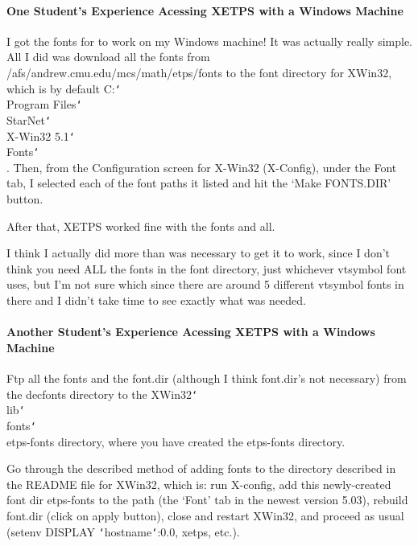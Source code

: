 \documentclass{article}
\begin{document}
\paragraph{One Student's Experience Acessing XETPS with a Windows Machine}

I got the fonts for {\ETPS} to work on my Windows machine! It was actually
really simple. All I did was download all the fonts from
/afs/andrew.cmu.edu/mcs/math/etps/fonts to the font directory for XWin32,
which is by default C:{\tt\char`\\}Program Files{\tt\char`\\}StarNet{\tt\char`\\}X-Win32 5.1{\tt\char`\\}Fonts{\tt\char`\\}.
Then, from the Configuration screen for X-Win32 (X-Config), under the Font
tab, I selected each of the font paths it listed and hit the `Make
FONTS.DIR' button.

After that, XETPS worked fine with the fonts and all.

I think I actually did more than was necessary to get it to work,
since I don't think you need ALL the fonts in the {\ETPS} font directory,
just whichever vtsymbol font {\ETPS} uses, but I'm not sure which since
there are around 5 different vtsymbol fonts in there and I didn't take
time to see exactly what was needed.

\paragraph{Another Student's Experience Acessing XETPS with a Windows Machine}

Ftp all the fonts and the font.dir (although I think font.dir's not
necessary)  from the decfonts directory to the \linebreak
XWin32{\tt\char`\\}lib{\tt\char`\\}fonts{\tt\char`\\}etps-fonts
directory, where you have created the etps-fonts directory.

Go through the described method of adding fonts to the directory
described in the README file for XWin32, which
is:  run X-config, add this newly-created font dir etps-fonts to the path
(the `Font' tab in the newest version 5.03), rebuild font.dir (click on
apply button), close and restart XWin32, and proceed as usual (setenv
DISPLAY {\tt\char`\<}hostname{\tt\char`\>}:0.0, xetps, etc.).
\end{document}
